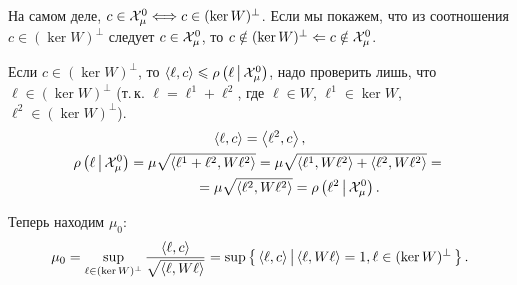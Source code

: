 На самом деле, $c \in \mathcal{X}_\mu^0 \Longleftrightarrow c \in (\ker W)^\perp$.
Если мы покажем, что из соотношения $c \in (\ker W)^\perp$ следует
$c \in \mathcal{X}_\mu^0$,
то $c \notin (\ker W)^\perp \Leftarrow c \notin \mathcal{X}_\mu^0$.

Если $c \in (\ker W)^\perp$,
то $\left<\ell,c\right> \leqslant \rho\left(\ell\,\middle|\,\mathcal{X}_\mu^0\right)$, надо проверить лишь,
что $\ell \in (\ker W)^\perp$ (т.\,к. $\ell = \ell^1 + \ell^2$,
где $\ell \in W$, $\ell^1 \in \ker W$, $\ell^2 \in (\ker W)^\perp$).
\begin{gather*}
	\scalar{\ell}{c} = \scalar{\ell^2}{c},\\
	\sufu{\ell}{\soa_\mu^0} =
	\mu \sqrt{\scalar{\ell^1 + \ell^2}{W \ell^2}} =
	\mu \sqrt{\scalar{\ell^1}{W \ell^2} + \scalar{\ell^2}{W \ell^2}} ={}\\
	\phantom{\sufu{\ell}{\soa_\mu^0}}{}= \mu \sqrt{\scalar{\ell^2}{W \ell^2}} =
	\sufu{\ell^2}{\soa_\mu^0}.
\end{gather*}

Теперь находим $\mu_0$:
\begin{equation*}
	\mu_0 = \sup_{\ell \in (\ker W)^\perp}
	  \dfrac{\left<\ell,c\right>}{\sqrt{\left<\ell,W \ell\right>}} =
	\sup\left\{\, \left<\ell,c\right> \,\middle|\, \left<\ell,W \ell\right> = 1, \ell \in (\ker W)^\perp \,\right\}.
\end{equation*}